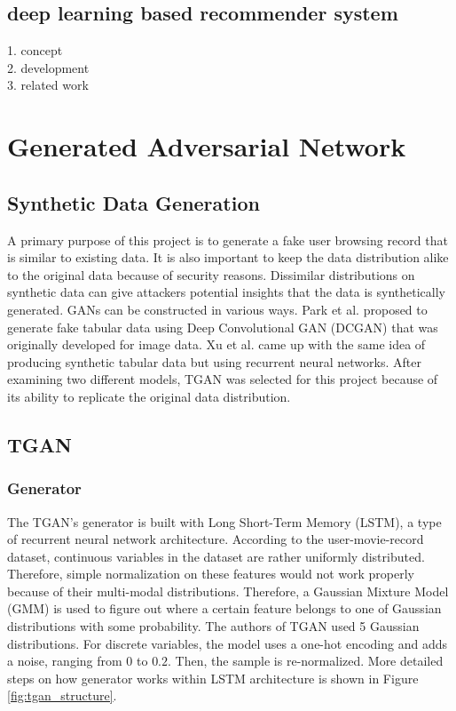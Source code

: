\documentclass[conference]{IEEEtran}
\begin{document}
\subsection{deep learning based recommender system}

    1. concept\\
    2. development\\
    3. related work\\



\section{Generated Adversarial Network}
\subsection{Synthetic Data Generation}
A primary purpose of this project is to generate a fake user browsing record that is similar to existing data. It is also important to keep the data distribution alike to the original data because of security reasons. Dissimilar distributions on synthetic data can give attackers potential insights that the data is synthetically generated. GANs can be constructed in various ways. Park et al. \cite{tableGAN} proposed to generate fake tabular data using Deep Convolutional GAN (DCGAN) \cite{DCGAN} that was originally developed for image data. Xu et al. \cite{TGAN} came up with the same idea of producing synthetic tabular data but using recurrent neural networks. After examining two different models, TGAN was selected for this project because of its ability to replicate the original data distribution.

\subsection{TGAN}
\subsubsection{Generator}
The TGAN's generator is built with Long Short-Term Memory (LSTM), a type of recurrent neural network architecture. According to the user-movie-record dataset, continuous variables in the dataset are rather uniformly distributed. Therefore, simple normalization on these features would not work properly because of their multi-modal distributions. Therefore, a Gaussian Mixture Model (GMM) is used to figure out where a certain feature belongs to one of Gaussian distributions with some probability. The authors of TGAN \cite{TGAN} used 5 Gaussian distributions. For discrete variables, the model uses a one-hot encoding and adds a noise, ranging from $0$ to $0.2$. Then, the sample is re-normalized. More detailed steps on how generator works within LSTM architecture is shown in Figure \ref{fig:tgan_structure}.
\end{document}
